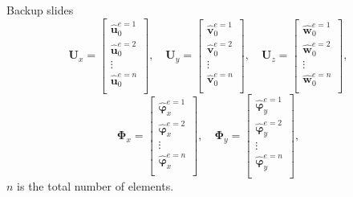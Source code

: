 \documentclass[10pt]{beamer} %
\renewcommand{\vec}[1]{\mathbf{#1}}
\newcommand{\bs}[1]{\boldsymbol{#1}}
\begin{document}
\begin{frame}{Backup slides}
	\begin{equation*}
	\vec{U}_x = \left[
	\begin{array}{c}  
	\hat{\vec{u}}_0^{e=1}  \\[2pt]
	\hat{\vec{u}}_0^{e=2} \\[2pt]
	\vdots\\[2pt]
	\hat{\vec{u}}_0^{e=n}\\[2pt]
	\end{array}\right],
	\quad
	\vec{U}_y = \left[
	\begin{array}{c}  
	\hat{\vec{v}}_0^{e=1}  \\[2pt]
	\hat{\vec{v}}_0^{e=2} \\[2pt]
	\vdots\\[2pt]
	\hat{\vec{v}}_0^{e=n}\\[2pt]
	\end{array}\right],
	\quad
	\vec{U}_z = \left[
	\begin{array}{c}  
	\hat{\vec{w}}_0^{e=1}  \\[2pt]
	\hat{\vec{w}}_0^{e=2} \\[2pt]
	\vdots\\[2pt]
	\hat{\vec{w}}_0^{e=n}\\[2pt]
	\end{array}\right],
	\end{equation*}
	\begin{equation*}
	\bs{\Phi}_x = \left[
	\begin{array}{c}  
	\hat{\bs{\varphi}}_x^{e=1}  \\[2pt]
	\hat{\bs{\varphi}}_x^{e=2} \\[2pt]
	\vdots\\[2pt]
	\hat{\bs{\varphi}}_x^{e=n}\\[2pt]
	\end{array}\right],
	\quad
	\bs{\Phi}_y = \left[
	\begin{array}{c}  
	\hat{\bs{\varphi}}_y^{e=1}  \\[2pt]
	\hat{\bs{\varphi}}_y^{e=2} \\[2pt]
	\vdots\\[2pt]
	\hat{\bs{\varphi}}_y^{e=n}\\[2pt]
	\end{array}\right],
	\end{equation*}
	$n$ is the total number of elements.\\	
\end{frame}	
\end{document}
